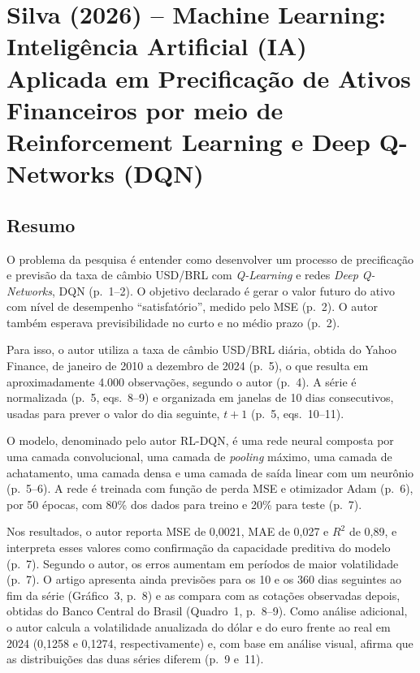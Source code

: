 \section[Silva (2026) ML: IA Aplicada ...]{Silva (2026) -- Machine Learning: Inteligência Artificial (IA) Aplicada em Precificação de Ativos Financeiros por meio de Reinforcement Learning e Deep Q-Networks (DQN)}

\subsection*{Resumo}

O problema da pesquisa é entender como desenvolver um processo de precificação e previsão da taxa de câmbio USD/BRL com \emph{Q-Learning} e redes \emph{Deep Q-Networks}, DQN (p.~1--2). O objetivo declarado é gerar o valor futuro do ativo com nível de desempenho ``satisfatório'', medido pelo MSE (p.~2). O autor também esperava previsibilidade no curto e no médio prazo (p.~2).

Para isso, o autor utiliza a taxa de câmbio USD/BRL diária, obtida do Yahoo Finance, de janeiro de 2010 a dezembro de 2024 (p.~5), o que resulta em aproximadamente 4.000 observações, segundo o autor (p.~4). A série é normalizada (p.~5, eqs.~8--9) e organizada em janelas de 10 dias consecutivos, usadas para prever o valor do dia seguinte, $t+1$ (p.~5, eqs.~10--11).

O modelo, denominado pelo autor RL-DQN, é uma rede neural composta por uma camada convolucional, uma camada de \emph{pooling} máximo, uma camada de achatamento, uma camada densa e uma camada de saída linear com um neurônio (p.~5--6). A rede é treinada com função de perda MSE e otimizador Adam (p.~6), por 50 épocas, com 80\% dos dados para treino e 20\% para teste (p.~7).

Nos resultados, o autor reporta MSE de 0,0021, MAE de 0,027 e $R^2$ de 0,89, e interpreta esses valores como confirmação da capacidade preditiva do modelo (p.~7). Segundo o autor, os erros aumentam em períodos de maior volatilidade (p.~7). O artigo apresenta ainda previsões para os 10 e os 360 dias seguintes ao fim da série (Gráfico~3, p.~8) e as compara com as cotações observadas depois, obtidas do Banco Central do Brasil (Quadro~1, p.~8--9). Como análise adicional, o autor calcula a volatilidade anualizada do dólar e do euro frente ao real em 2024 (0,1258 e 0,1274, respectivamente) e, com base em análise visual, afirma que as distribuições das duas séries diferem (p.~9 e~11).

